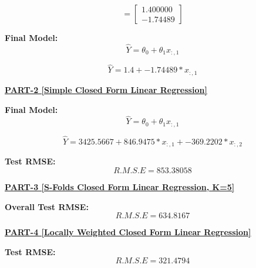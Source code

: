 \documentclass{report}
\begin{document}
\begin{flushleft}
\[=
\begin{bmatrix}
1.400000\\
-1.74489
\end{bmatrix}
\]

\textbf{Final Model:} \linebreak[2]
\begin{equation}
\hat{Y} = \theta_0 + \theta_{1} x_{:, 1}
\end{equation}

\begin{equation}
\hat{Y} = 1.4 + -1.74489*x_{:, 1}
\end{equation}

\break

\underline { \textbf{PART-2 [Simple Closed Form Linear Regression]}}  \linebreak[2]

\textbf{Final Model:} \linebreak[2]
\begin{equation}
\hat{Y} = \theta_0 + \theta_{1} x_{:, 1}
\end{equation}

\begin{equation}
\hat{Y} = 3425.5667 + 846.9475*x_{:, 1} + -369.2202*x_{:, 2}
\end{equation}

\textbf{Test RMSE:} \linebreak[2]
\begin{equation}
R.M.S.E = 853.38058
\end{equation} \linebreak[3]

\underline { \textbf{PART-3 [S-Folds Closed Form Linear Regression, K=5]}}  \linebreak[2]

\textbf{Overall Test RMSE:} \linebreak[2]
\begin{equation}
R.M.S.E = 634.8167
\end{equation} \linebreak[3]

\underline { \textbf{PART-4 [Locally Weighted Closed Form Linear Regression]}}  \linebreak[2]

\textbf{Test RMSE:} \linebreak[2]
\begin{equation}
R.M.S.E = 321.4794
\end{equation} \linebreak[3]


\end{flushleft}
\end{document}
